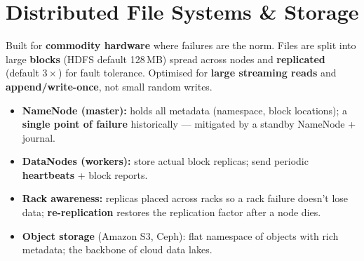 \documentclass[11pt,a4paper]{article}
\begin{document}
\section{Distributed File Systems \& Storage}

\begin{conceptbox}
Built for \textbf{commodity hardware} where failures are the norm. Files are split into large \textbf{blocks} (HDFS default 128\,MB) spread across nodes and \textbf{replicated} (default $3\times$) for fault tolerance. Optimised for \textbf{large streaming reads} and \textbf{append/write-once}, not small random writes.
\end{conceptbox}

\begin{center}
\end{center}

\begin{itemize}[leftmargin=*, itemsep=2pt]
  \item \textbf{NameNode (master):} holds all metadata (namespace, block locations); a \textbf{single point of failure} historically --- mitigated by a standby NameNode + journal.
  \item \textbf{DataNodes (workers):} store actual block replicas; send periodic \textbf{heartbeats} + block reports.
  \item \textbf{Rack awareness:} replicas placed across racks so a rack failure doesn't lose data; \textbf{re-replication} restores the replication factor after a node dies.
  \item \textbf{Object storage} (Amazon S3, Ceph): flat namespace of objects with rich metadata; the backbone of cloud data lakes.
\end{itemize}
\end{document}
